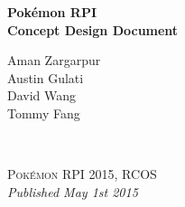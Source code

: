 \documentclass[11pt,fleqn]{book} %
\begin{document}
\let\cleardoublepage\clearpage


\begingroup
\thispagestyle{empty}
\centering
\vspace*{5cm}
\par\normalfont\fontsize{35}{35}\sffamily\selectfont
\textbf{Pokémon RPI\\Concept Design Document}\\
{\LARGE }\par %
\vspace*{1cm}
{\Huge Aman Zargarpur\\Austin Gulati\\David Wang\\Tommy Fang}\par %
\endgroup


\newpage
~\vfill
\thispagestyle{empty}


\noindent \textsc{Pokémon RPI 2015, RCOS}\\

\noindent \textit{Published May 1st 2015} %



\pagestyle{empty} %

\renewcommand\contentsname{Pokédex}
\renewcommand{\bibname}{Bibliographie}
\tableofcontents%


\pagestyle{fancy} %

\end{document}
